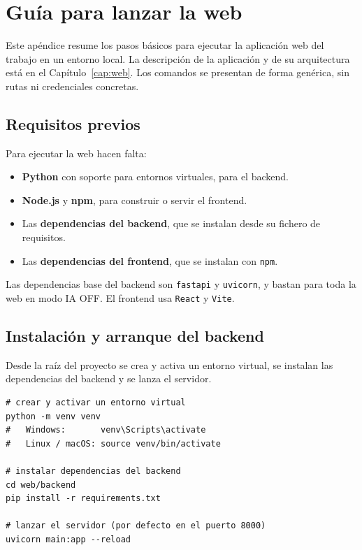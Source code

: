 \chapter{Guía para lanzar la web}
\label{ap:guia_lanzamiento}

Este apéndice resume los pasos básicos para ejecutar la aplicación web del trabajo en un entorno local. La descripción de la aplicación y de su arquitectura está en el Capítulo~\ref{cap:web}. Los comandos se presentan de forma genérica, sin rutas ni credenciales concretas.

\section{Requisitos previos}
\label{sec:apb_requisitos}

Para ejecutar la web hacen falta:

\begin{itemize}
  \item \textbf{Python} con soporte para entornos virtuales, para el backend.
  \item \textbf{Node.js} y \textbf{npm}, para construir o servir el frontend.
  \item Las \textbf{dependencias del backend}, que se instalan desde su fichero de requisitos.
  \item Las \textbf{dependencias del frontend}, que se instalan con \texttt{npm}.
\end{itemize}

Las dependencias base del backend son \texttt{fastapi} y \texttt{uvicorn}, y bastan para toda la web en modo IA OFF. El frontend usa \texttt{React} y \texttt{Vite}.

\section{Instalación y arranque del backend}
\label{sec:apb_backend}

Desde la raíz del proyecto se crea y activa un entorno virtual, se instalan las dependencias del backend y se lanza el servidor.

\begin{small}
\begin{verbatim}
# crear y activar un entorno virtual
python -m venv venv
#   Windows:       venv\Scripts\activate
#   Linux / macOS: source venv/bin/activate

# instalar dependencias del backend
cd web/backend
pip install -r requirements.txt

# lanzar el servidor (por defecto en el puerto 8000)
uvicorn main:app --reload
\end{verbatim}
\end{small}

